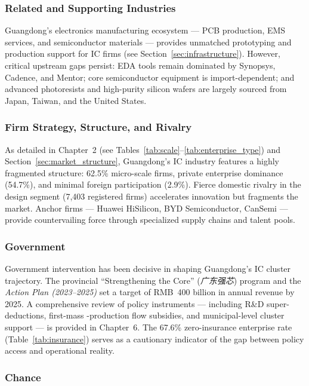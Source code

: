 \documentclass[12pt,a4paper]{article}
\begin{document}
\subsubsection{Related and Supporting Industries}

Guangdong's electronics manufacturing ecosystem — PCB production, EMS
services, and semiconductor materials — provides unmatched prototyping
and production support for IC firms (see Section~\ref{sec:infrastructure}).
However, critical upstream gaps persist: EDA tools remain dominated by
Synopsys, Cadence, and Mentor; core semiconductor equipment is
import-dependent; and advanced photoresists and high-purity silicon
wafers are largely sourced from Japan, Taiwan, and the United States.

\subsubsection{Firm Strategy, Structure, and Rivalry}

As detailed in Chapter~2 (see
Tables~\ref{tab:scale}--\ref{tab:enterprise_type})
and Section~\ref{sec:market_structure}, Guangdong's IC industry features a
highly fragmented structure: 62.5\% micro-scale firms, private enterprise
dominance (54.7\%), and minimal foreign participation (2.9\%). Fierce
domestic rivalry in the design segment (7,403 registered firms) accelerates
innovation but fragments the market. Anchor firms — Huawei HiSilicon, BYD
Semiconductor, CanSemi — provide countervailing force through specialized
supply chains and talent pools.

\subsubsection{Government}

Government intervention has been decisive in shaping Guangdong's IC
cluster trajectory. The provincial ``Strengthening the Core''
(\textit{广东强芯}) program and the \textit{Action Plan (2023--2025)}
set a target of RMB~400 billion in annual revenue by 2025. A comprehensive
review of policy instruments — including R\&D super-deductions, first-mass
-production flow subsidies, and municipal-level cluster support — is
provided in Chapter~6. The 67.6\% zero-insurance enterprise rate
(Table~\ref{tab:insurance}) serves as a cautionary indicator of the gap
between policy access and operational reality.

\subsubsection{Chance}
\end{document}
